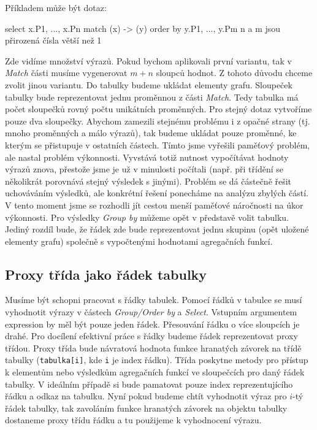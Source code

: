 Příkladem může být dotaz: 
\begin{code}
select x.P1, ..., x.Pn match (x) -> (y) order by y.P1, ..., y.Pm  
n a m jsou přirozená čísla větší než 1
\end{code}
Zde vidíme množství výrazů.
Pokud bychom aplikovali první variantu, tak v \textit{Match} části musíme vygenerovat $m + n$ sloupců hodnot.
Z tohoto důvodu chceme zvolit jinou variantu.
Do tabulky budeme ukládat elementy grafu.
Sloupeček tabulky bude reprezentovat jednu proměnnou z části \textit{Match}.
Tedy tabulka má počet sloupečků rovný počtu unikátních proměnných. 
Pro stejný dotaz vytvoříme pouze dva sloupečky.
Abychom zamezili stejnému problému i z opačné strany (tj. mnoho proměnných a málo výrazů), tak budeme ukládat pouze proměnné, ke kterým se přistupuje v ostatních částech.
Tímto jsme vyřešili paměťový problém, ale nastal problém výkonnosti.
Vyvstává totiž nutnost vypočítávat hodnoty výrazů znova, přestože jsme je už v minulosti počítali (např. při třídění se několikrát porovnává stejný výsledek s jinými).
Problém se dá částečně řešit uchováváním výsledků, ale konkrétní řešení ponecháme na analýzu zbylých částí.
V tento moment jsme se rozhodli jít cestou menší paměťové náročnosti na úkor výkonnosti.
Pro výsledky \textit{Group by} můžeme opět v představě volit tabulku.
Jediný rozdíl bude, že řádek zde bude reprezentovat jednu skupinu (opět uložené elementy grafu) společně s vypočtenými hodnotami agregačních funkcí.

\subsection{Proxy třída jako řádek tabulky}

Musíme být schopni pracovat s řádky tabulek.
Pomocí řádků v tabulce se musí vyhodnotit výrazy v částech \textit{Group/Order by} a \textit{Select}.
Vstupním argumentem expression by měl být pouze jeden řádek.
Přesouvání řádku o více sloupcích je drahé.
Pro docílení efektivní práce s řádky budeme řádek reprezentovat proxy třídou.
Proxy třída bude návratová hodnota funkce hranatých závorek na třídě tabulky (\texttt{tabulka[i]}, kde \texttt{i} je index řádku).
Třída poskytne metody pro přístup k elementům nebo výsledkům agregačních funkcí ve sloupečcích pro daný řádek tabulky.
V ideálním případě si bude pamatovat pouze index reprezentujícího řádku a odkaz na tabulku.
Nyní pokud budeme chtít vyhodnotit výraz pro $i$-tý řádek tabulky, tak zavoláním funkce hranatých závorek na objektu tabulky dostaneme proxy třídu řádku a tu použijeme k vyhodnocení výrazu.


